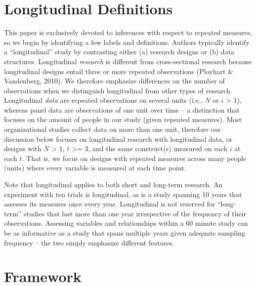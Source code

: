 \documentclass[english,,man]{apa6}
\theoremstyle{definition}
\theoremstyle{definition}
\theoremstyle{definition}
\theoremstyle{remark}
\begin{document}
\hypertarget{longitudinal-definitions}{%
\section{Longitudinal Definitions}\label{longitudinal-definitions}}

This paper is exclusively devoted to inferences with respect to repeated
measures, so we begin by identifying a few labels and definitions.
Authors typically identify a \enquote{longitudinal} study by contrasting
either (a) research designs or (b) data structures. Longitudinal
\emph{research} is different from cross-sectional research because
longitudinal designs entail three or more repeated observations
(Ployhart \& Vandenberg, 2010). We therefore emphasize differences on
the number of observations when we distinguish longitudinal from other
types of research. Longitudinal \emph{data} are repeated observations on
several units (i.e., \(N\) or \(i\) \textgreater{} 1), whereas panel
data are observations of one unit over time -- a distinction that
focuses on the amount of people in our study (given repeated measures).
Most organizational studies collect data on more than one unit,
therefore our discussion below focuses on longitudinal research with
longitudinal data, or designs with \(N\) \textgreater{} 1, \(t\)
\textgreater{}= 3, and the same construct(s) measured on each \(i\) at
each \(t\). That is, we focus on designs with repeated measures across
many people (units) where every variable is measured at each time point.

Note that longitudinal applies to both short and long-term research. An
experiment with ten trials is longitudinal, as is a study spanning 10
years that assesses its measures once every year. Longitudinal is not
reserved for \enquote{long-term} studies that last more than one year
irrespective of the frequency of their observations. Assessing variables
and relationships within a 60 minute study can be as informative as a
study that spans multiple years given adequate sampling frequency -- the
two simply emphasize different features.

\hypertarget{framework}{%
\section{Framework}\label{framework}}
\end{document}
